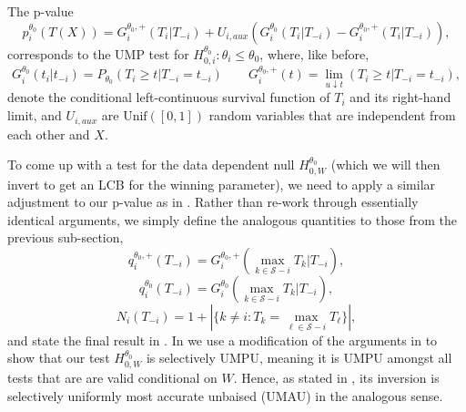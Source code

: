 \documentclass{article}
\begin{document}
\begin{appendix}
The p-value 
\begin{equation}
    \label{eq:ump_exp_fam}
    p_i^{\theta_0}(T(X)) = G^{\theta_0, +}_i(T_i|T_{-i}) + U_{i, aux}(G^{\theta_0}_i(T_i|T_{-i}) - G^{\theta_0, +}_i(T_i|T_{-i})),
\end{equation}
corresponds to the UMP test for $H_{0, i}^{\theta_0}: \theta_i \leq \theta_0$, where, like before,
\begin{equation*}
    G^{\theta_0}_i(t_i | t_{-i}) = P_{\theta_0}(T_i \geq t | T_{-i} = t_{-i}) \qquad G^{\theta_0, +}_i(t) = \lim_{u \downarrow t}(T_i \geq t | T_{-i} = t_{-i} ),
\end{equation*}
denote the conditional left-continuous survival function of $T_i$ and its right-hand limit, and $U_{i, aux}$ are $\text{Unif}([0,1])$ random variables that are independent from each other and $X$.

To come up with a test for the data dependent null $H_{0, W}^{\theta_0}$ (which we will then invert to get an LCB for the winning parameter), we need to apply a similar adjustment to our p-value as in . Rather than re-work through essentially identical arguments, we simply define the analogous quantities to those from the previous sub-section,
\begin{equation}
    \label{eq:exp_fam_lower}
    q^{\theta_0, +}_i(T_{-i}) = G^{\theta_0, +}_i(\max_{k \in \mathcal{S} - i } T_k | T_{-i}), 
\end{equation} 
\begin{equation}
    \label{eq:exp_fam_upper}
    q^{\theta_0}_i(T_{-i}) = G^{\theta_0}_i(\max_{k \in \mathcal{S} - i } T_k | T_{-i}),
\end{equation} 
\begin{equation}
    \label{eq:exp_fam_num_ties}
    N_i(T_{-i}) = 1 + | \{k \neq i: T_k = \max_{\ell \in \mathcal{S} - i} T_\ell \}|,
\end{equation}
and state the final result in . In  we use a modification of the arguments in \cite{Fithian2017} to show that our test $H^{\theta_0}_{0, W}$ is selectively UMPU, meaning it is UMPU amongst all tests that are are valid conditional on $W$. Hence, as stated in , its inversion is selectively uniformly most accurate unbaised (UMAU) in the analogous sense. 


\end{appendix}
\end{document}
